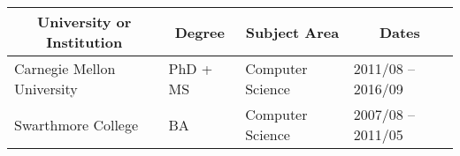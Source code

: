 \documentclass[10pt]{article}
\begin{document}
{%
\vspace{-30pt}
\noindent\vspace{-2em}
\begin{table}[h!]
  \begin{tabular}{ p{} p{} p{} p{} }
    \toprule
    \multicolumn{1}{c}{\bf University or Institution} & \multicolumn{1}{c}{\bf Degree} & \multicolumn{1}{c}{\bf Subject Area}            & \multicolumn{1}{c}{\bf Dates} \\
    \midrule
    Carnegie Mellon University & PhD + MS & Computer Science & 2011/08 -- 2016/09 \\
    Swarthmore College         & BA       & Computer Science & 2007/08 -- 2011/05 \\
    \bottomrule
  \end{tabular}
\end{table}


}
\end{document}
